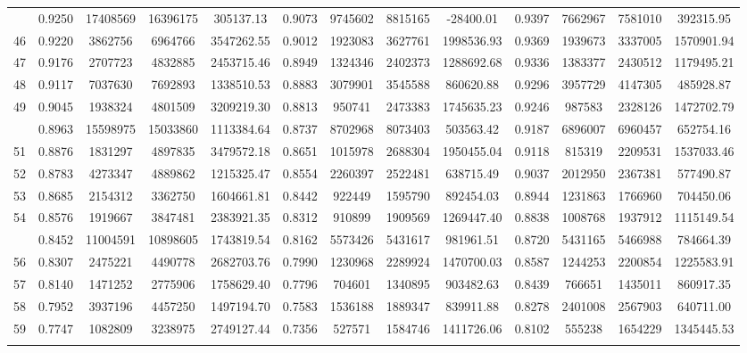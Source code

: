 \documentclass[
  12pt,
]{article}
\begin{document}
\begin{longtable}[t]{lcccccccccccc}
\addlinespace
45 & 0.9250 & 17408569 & 16396175 & 305137.13 & 0.9073 & 9745602 & 8815165 & -28400.01 & 0.9397 & 7662967 & 7581010 & 392315.95\\
46 & 0.9220 & 3862756 & 6964766 & 3547262.55 & 0.9012 & 1923083 & 3627761 & 1998536.93 & 0.9369 & 1939673 & 3337005 & 1570901.94\\
47 & 0.9176 & 2707723 & 4832885 & 2453715.46 & 0.8949 & 1324346 & 2402373 & 1288692.68 & 0.9336 & 1383377 & 2430512 & 1179495.21\\
48 & 0.9117 & 7037630 & 7692893 & 1338510.53 & 0.8883 & 3079901 & 3545588 & 860620.88 & 0.9296 & 3957729 & 4147305 & 485928.87\\
49 & 0.9045 & 1938324 & 4801509 & 3209219.30 & 0.8813 & 950741 & 2473383 & 1745635.23 & 0.9246 & 987583 & 2328126 & 1472702.79\\
\addlinespace
50 & 0.8963 & 15598975 & 15033860 & 1113384.64 & 0.8737 & 8702968 & 8073403 & 503563.42 & 0.9187 & 6896007 & 6960457 & 652754.16\\
51 & 0.8876 & 1831297 & 4897835 & 3479572.18 & 0.8651 & 1015978 & 2688304 & 1950455.04 & 0.9118 & 815319 & 2209531 & 1537033.46\\
52 & 0.8783 & 4273347 & 4889862 & 1215325.47 & 0.8554 & 2260397 & 2522481 & 638715.49 & 0.9037 & 2012950 & 2367381 & 577490.87\\
53 & 0.8685 & 2154312 & 3362750 & 1604661.81 & 0.8442 & 922449 & 1595790 & 892454.03 & 0.8944 & 1231863 & 1766960 & 704450.06\\
54 & 0.8576 & 1919667 & 3847481 & 2383921.35 & 0.8312 & 910899 & 1909569 & 1269447.40 & 0.8838 & 1008768 & 1937912 & 1115149.54\\
\addlinespace
55 & 0.8452 & 11004591 & 10898605 & 1743819.54 & 0.8162 & 5573426 & 5431617 & 981961.51 & 0.8720 & 5431165 & 5466988 & 784664.39\\
56 & 0.8307 & 2475221 & 4490778 & 2682703.76 & 0.7990 & 1230968 & 2289924 & 1470700.03 & 0.8587 & 1244253 & 2200854 & 1225583.91\\
57 & 0.8140 & 1471252 & 2775906 & 1758629.40 & 0.7796 & 704601 & 1340895 & 903482.63 & 0.8439 & 766651 & 1435011 & 860917.35\\
58 & 0.7952 & 3937196 & 4457250 & 1497194.70 & 0.7583 & 1536188 & 1889347 & 839911.88 & 0.8278 & 2401008 & 2567903 & 640711.00\\
59 & 0.7747 & 1082809 & 3238975 & 2749127.44 & 0.7356 & 527571 & 1584746 & 1411726.06 & 0.8102 & 555238 & 1654229 & 1345445.53\\
\addlinespace

\end{longtable}
\end{document}
